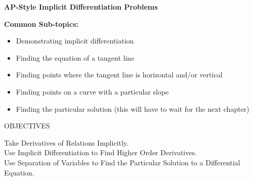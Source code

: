 \bigskip

\textbf{\large{AP-Style Implicit Differentiation Problems}} \par

\textbf{Common Sub-topics:} \begin{itemize}
    \item Demonstrating implicit differentiation 
    \item Finding the equation of a tangent line
    \item Finding points where the tangent line is horizontal and/or vertical
    \item Finding points on a curve with a particular slope
    \item Finding the particular solution (this will have to wait for the next chapter)
\end{itemize}

\begin{tcolorbox}[objective]
    \begin{center}
        OBJECTIVES \\[11pt]
    \end{center}
    Take Derivatives of Relations Implicitly. \\
    Use Implicit Differentiation to Find Higher Order Derivatives. \\
    Use Separation of Variables to Find the Particular Solution to a Differential Equation.
\end{tcolorbox} \vspace{11pt}

